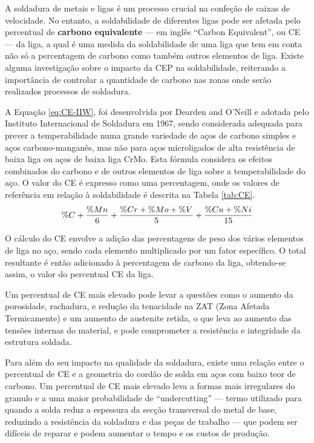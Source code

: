 A soldadura de metais e ligas é um processo crucial na confeção de caixas de velocidade. No entanto, a soldabilidade de diferentes ligas pode ser afetada pelo percentual de  \textbf{carbono equivalente} — em inglês “Carbon Equivalent”, ou CE — da liga, a qual é uma medida da soldabilidade de uma liga que tem em conta não só a percentagem de carbono como também outros elementos de liga. Existe alguma investigação sobre o impacto da CEP na soldabilidade, reiterando a importância de controlar a quantidade de carbono nas zonas onde serão realizados processos de soldadura.
\par
A Equação \ref{eq:CE-IIW}, foi desenvolvida por Dearden and O'Neill e adotada pelo Instituto Internacional de Soldadura em 1967, sendo considerada adequada para prever a temperabilidade numa grande variedade de aços de carbono simples e aços carbono-manganês, mas não para aços microligados de alta resistência de baixa liga ou aços de baixa liga CrMo. Esta fórmula considera os efeitos combinados do carbono e de outros elementos de liga sobre a temperabilidade do aço. O valor do CE é expresso como uma percentagem, onde os valores de referência em relação à soldabilidade é descrita na Tabela \ref{tab:CE}.
\vspace{5mm}
\begin{equation}
    \centering
    \label{eq:CE-IIW}
    \%C + \frac{\%Mn}{6}+\frac{\%Cr+\%Mo+\%V}{5}+\frac{\%Cu+\%Ni}{15}
\end{equation}
\vspace{5mm}
\par
O cálculo do CE envolve a adição das percentagens de peso dos vários elementos de liga no aço, sendo cada elemento multiplicado por um fator específico. O total resultante é então adicionado à percentagem de carbono da liga, obtendo-se assim, o valor do percentual CE da liga.
\par
Um percentual de CE mais elevado pode levar a questões como o aumento da porosidade, rachadura, e redução da tenacidade na ZAT (Zona Afetada Termicamente)\cite{Karsamas2003} e um aumento de austenite retida\cite{Park2018}, o que leva ao aumento das tensões internas do material, e pode comprometer a resistência e integridade da estrutura soldada.
\par
Para além do seu impacto na qualidade da soldadura, existe uma relação entre o percentual de  CE e a geometria do cordão de solda em aços com baixo teor de carbono. Um percentual de CE mais elevado leva a formas mais irregulares do granulo e a uma maior probabilidade de “undercutting” — termo utilizado para quando a solda reduz a espessura da secção transversal do metal de base, reduzindo a resistência da soldadura e das peças de trabalho — que podem ser difíceis de reparar e podem aumentar o tempo e os custos de produção.
